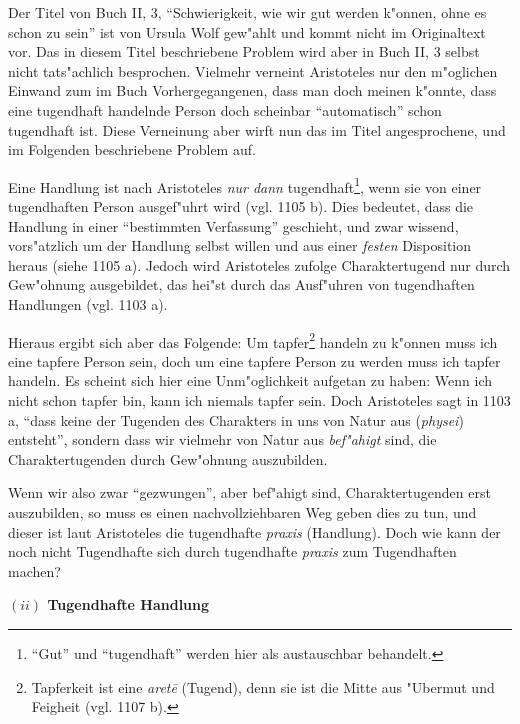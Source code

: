 \documentclass[a4paper, emulatestandardclasses, 12pt]{scrartcl}
\begin{document}
\begin{onehalfspace}
\noindent Der Titel von Buch II, 3, "`Schwierigkeit, wie wir gut werden k"onnen, ohne es schon zu sein"' ist von Ursula Wolf gew"ahlt und kommt nicht im Originaltext vor. Das in diesem Titel beschriebene Problem wird aber in Buch II, 3 selbst nicht tats"achlich besprochen. Vielmehr verneint Aristoteles nur den m"oglichen Einwand zum im Buch Vorhergegangenen, dass man doch meinen k"onnte, dass eine tugendhaft handelnde Person doch scheinbar "`automatisch"' schon tugendhaft ist. Diese Verneinung aber wirft nun das im Titel angesprochene, und im Folgenden beschriebene Problem auf.

Eine Handlung ist nach Aristoteles \emph{nur dann} tugendhaft\footnote{"`Gut"' und "`tugendhaft"' werden hier als austauschbar behandelt.}, wenn sie von einer tugendhaften Person ausgef"uhrt wird (vgl. 1105 b). Dies bedeutet, dass die Handlung in einer "`bestimmten Verfassung"' geschieht, und zwar wissend, vors"atzlich um der Handlung selbst willen und aus einer \emph{festen} Disposition heraus (siehe 1105 a). Jedoch wird Aristoteles zufolge Charaktertugend nur durch Gew"ohnung ausgebildet, das hei"st durch das Ausf"uhren von tugendhaften Handlungen (vgl. 1103 a). 

Hieraus ergibt sich aber das Folgende: Um tapfer\footnote{Tapferkeit ist eine \emph{aret\={e}} (Tugend), denn sie ist die Mitte aus "Ubermut und Feigheit (vgl. 1107 b).} handeln zu k"onnen muss ich eine tapfere Person sein, doch um eine tapfere Person zu werden muss ich tapfer handeln. Es scheint sich hier eine Unm"oglichkeit aufgetan zu haben: Wenn ich nicht schon tapfer bin, kann ich niemals tapfer sein. Doch Aristoteles sagt in 1103 a, "`dass keine der Tugenden des Charakters in uns von Natur aus (\emph{physei}) entsteht"', sondern dass wir vielmehr von Natur aus \emph{bef"ahigt} sind, die Charaktertugenden durch Gew"ohnung auszubilden. 

Wenn wir also zwar "`gezwungen"', aber bef"ahigt sind, Charaktertugenden erst auszubilden, so muss es einen nachvollziehbaren Weg geben dies zu tun, und dieser ist laut Aristoteles die tugendhafte \emph{praxis} (Handlung). Doch wie kann der noch nicht Tugendhafte sich durch tugendhafte \emph{praxis} zum Tugendhaften machen?

\vspace{5mm}
\noindent\textbf{$(ii)$ Tugendhafte Handlung}	


\end{onehalfspace}
\end{document}
